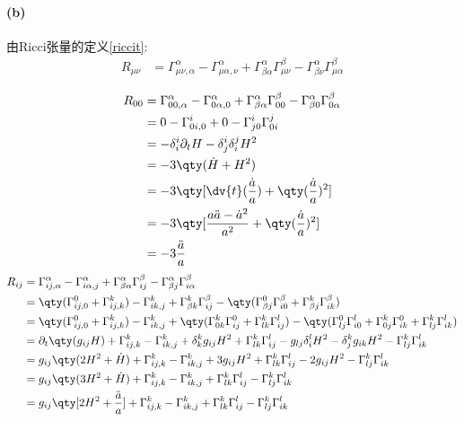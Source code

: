 \paragraph{(b)}
由Ricci张量的定义\ref{riccit}:
\begin{align*}
    R_{\mu\nu} &= \Gamma^\alpha_{\mu\nu, \alpha} - \Gamma^\alpha_{\mu\alpha, \nu} + \Gamma^\alpha_{\beta\alpha}\Gamma^\beta_{\mu\nu} - \Gamma^\alpha_{\beta\nu}\Gamma^\beta_{\mu\alpha}\\
\end{align*}
\begin{align*}
    R_{00} &= \Gamma^\alpha_{00, \alpha} - \Gamma^\alpha_{0\alpha, 0} + \Gamma^\alpha_{\beta\alpha}\Gamma^\beta_{00} - \Gamma^\alpha_{\beta 0}\Gamma^\beta_{0\alpha}\\
        & = 0 - \Gamma^i_{0i,0} + 0 - \Gamma^i_{j0}\Gamma^j_{0i}\\
        & = -\delta^i_i\partial_tH - \delta^i_j\delta^j_iH^2 \\
        & = -3\qty(\dot{H} + H^2)\\
        & = -3\qty[\dv{t}(\frac{\dot{a}}{a}) + \qty(\frac{\dot{a}}{a})^2]\\
        & = -3\qty[\frac{a\ddot{a} - \dot{a}^2}{a^2} +\qty(\frac{\dot{a}}{a})^2]\\
        & = -3 \frac{\ddot{a}}{a}
\end{align*}
\begin{align*}
    R_{ij} &= \Gamma^\alpha_{ij, \alpha} - \Gamma^\alpha_{i\alpha, j} + \Gamma^\alpha_{\beta\alpha}\Gamma^\beta_{ij} - \Gamma^\alpha_{\beta j}\Gamma^\beta_{i\alpha}\\
        & = \qty(\Gamma^0_{ij, 0} + \Gamma^k_{ij, k}) - \Gamma^k_{ik,j} + \Gamma^k_{\beta k}\Gamma^\beta_{ij} - \qty(\Gamma^0_{\beta j}\Gamma^\beta_{i0} + \Gamma^k_{\beta j}\Gamma^\beta_{ik}) \\
        & = \qty(\Gamma^0_{ij, 0} + \Gamma^k_{ij, k}) - \Gamma^k_{ik,j} + \qty(\Gamma^k_{0 k}\Gamma^0_{ij} + \Gamma^k_{l k}\Gamma^l_{ij}) - \qty(\Gamma^0_{l j}\Gamma^l_{i0} + \Gamma^k_{0 j}\Gamma^0_{ik} + \Gamma^k_{l j}\Gamma^l_{ik}) \\
        & = \partial_t\qty(g_{ij}H) + \Gamma^k_{ij, k} - \Gamma^k_{ik,j} + \delta^k_kg_{ij}H^2 + \Gamma^k_{lk}\Gamma^l_{ij} - g_{lj}\delta^l_iH^2 - \delta^k_jg_{ik}H^2 - \Gamma^k_{lj}\Gamma^l_{ik}\\
        & = g_{ij}\qty(2H^2 + \dot{H}) + \Gamma^k_{ij, k} - \Gamma^k_{ik,j} + 3g_{ij}H^2 + \Gamma^k_{lk}\Gamma^l_{ij} - 2g_{ij}H^2 -  \Gamma^k_{lj}\Gamma^l_{ik}\\
        & = g_{ij}\qty(3H^2 + \dot{H}) + \Gamma^k_{ij, k} - \Gamma^k_{ik,j}  + \Gamma^k_{lk}\Gamma^l_{ij}  -  \Gamma^k_{lj}\Gamma^l_{ik} \\
        & = g_{ij}\qty[2H^2 + \frac{\ddot{a}}{a}]+ \Gamma^k_{ij, k} - \Gamma^k_{ik,j}  + \Gamma^k_{lk}\Gamma^l_{ij}  -  \Gamma^k_{lj}\Gamma^l_{ik} \\
\end{align*}
